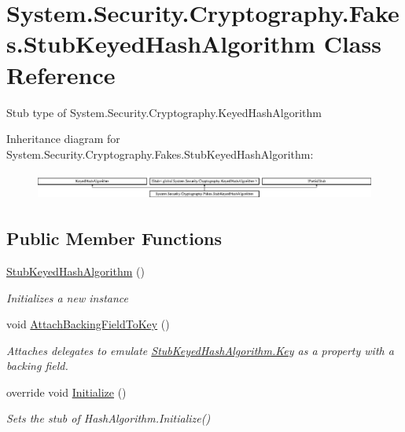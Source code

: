 \hypertarget{class_system_1_1_security_1_1_cryptography_1_1_fakes_1_1_stub_keyed_hash_algorithm}{\section{System.\-Security.\-Cryptography.\-Fakes.\-Stub\-Keyed\-Hash\-Algorithm Class Reference}
\label{class_system_1_1_security_1_1_cryptography_1_1_fakes_1_1_stub_keyed_hash_algorithm}
}


Stub type of System.\-Security.\-Cryptography.\-Keyed\-Hash\-Algorithm 


Inheritance diagram for System.\-Security.\-Cryptography.\-Fakes.\-Stub\-Keyed\-Hash\-Algorithm\-:\begin{figure}[H]
\begin{center}
\leavevmode
\includegraphics[height=0.921811cm]{class_system_1_1_security_1_1_cryptography_1_1_fakes_1_1_stub_keyed_hash_algorithm}
\end{center}
\end{figure}
\subsection*{Public Member Functions}
\begin{DoxyCompactItemize}
\item 
\hyperlink{class_system_1_1_security_1_1_cryptography_1_1_fakes_1_1_stub_keyed_hash_algorithm_ad8ce874cee9ea19d6059183425d0c93b}{Stub\-Keyed\-Hash\-Algorithm} ()
\begin{DoxyCompactList}\small\item\em Initializes a new instance\end{DoxyCompactList}\item 
void \hyperlink{class_system_1_1_security_1_1_cryptography_1_1_fakes_1_1_stub_keyed_hash_algorithm_a651202c7e1c00720699765ff81a59ee8}{Attach\-Backing\-Field\-To\-Key} ()
\begin{DoxyCompactList}\small\item\em Attaches delegates to emulate \hyperlink{class_system_1_1_security_1_1_cryptography_1_1_fakes_1_1_stub_keyed_hash_algorithm_a9ac3758e81e65a76ed9b2d4e66018508}{Stub\-Keyed\-Hash\-Algorithm.\-Key} as a property with a backing field.\end{DoxyCompactList}\item 
override void \hyperlink{class_system_1_1_security_1_1_cryptography_1_1_fakes_1_1_stub_keyed_hash_algorithm_ab8f5fc57e103caa6caa01c94d6ed65d9}{Initialize} ()
\begin{DoxyCompactList}\small\item\em Sets the stub of Hash\-Algorithm.\-Initialize()\end{DoxyCompactList}\end{DoxyCompactItemize}
